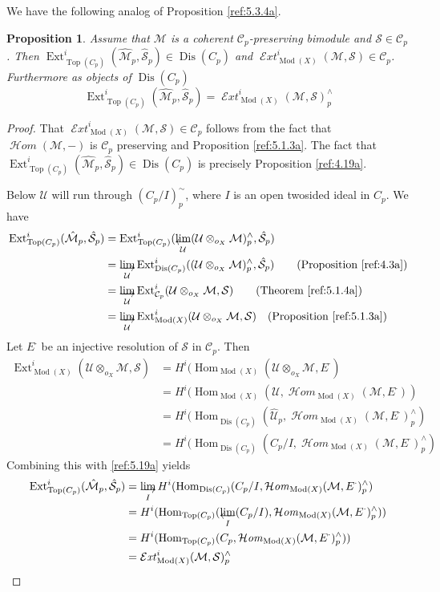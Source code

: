 \documentclass{amsproc}
\def\Cscr{{\mathcal C}}
\def\Escr{{\mathcal E}}
\def\Hscr{{\mathcal H}}
\def\Mscr{{\mathcal M}}
\def\Sscr{{\mathcal S}}
\def\Uscr{{\mathcal U}}
\DeclareMathOperator{\Dis}{Dis}
\def\HHom{\operatorname {\Hscr \mathit{om}}}
\def\HExt{\operatorname {\Escr \mathit{xt}}}
\def\Ext{\operatorname {Ext}}
\def\Hom{\operatorname {Hom}}
\def\HHom{\operatorname {\Hscr \mathit{om}}}
\def\HExt{\operatorname {\Escr \mathit{xt}}}
\def\Qch{\operatorname {Mod}}
\let\oldtext\text
\def\text#1{\oldtext{\upshape #1}}
\let\invlim\projlim
\DeclareMathOperator{\Top}{Top}
\newtheorem{propositions}[lemmas]{Proposition}
\theoremstyle{definition}
\theoremstyle{remark}
\def\dirlim{\mathop{\vtop{\baselineskip -100pt\lineskip -1pt\lineskiplimit 0pt
\setbox0\hbox{\upshape lim}\copy0\hbox to \wd0{\rightarrowfill}}}\limits}
\def\invlim{\mathop{\vtop{\baselineskip -100pt\lineskip -1pt\lineskiplimit 0pt
\setbox0\hbox{\upshape lim}\copy0\hbox to \wd0{\leftarrowfill}}}\limits}
\numberwithin{equation}{section}
\numberwithin{table}{section}
\numberwithin{figure}{section}
\begin{document}
We have the
following analog of Proposition \ref{ref:5.3.4a}.
\begin{propositions}
\label{ref:5.4.3a}
Assume that $\Mscr$ is a coherent $\Cscr_{p}$-preserving bimodule and
$\Sscr\in\Cscr_{p}$. Then 
$\Ext^i_{\Top(C_p)}(\hat{\Mscr}_{p},\hat{\Sscr}_{p})\in \Dis(C_p)$ and 
$\HExt^i_{\Qch(X)}(\Mscr,\Sscr)\in \Cscr_p$. 
Furthermore as
objects of $\Dis(C_p)$
\[
\Ext^i_{\Top(C_p)}(\hat{\Mscr}_{p},\hat{\Sscr}_{p})
=
\HExt^i_{\Qch(X)}(\Mscr,\Sscr)^\wedge_{p}
\]
\end{propositions}
\begin{proof} 
That $\HExt^i_{\Qch(X)}(\Mscr,\Sscr)\in \Cscr_p$ follows from
the fact that $\HHom(\Mscr,-)$ is $\Cscr_{p}$ preserving and
Proposition \ref{ref:5.1.3a}. The fact that 
$\Ext^i_{\Top(C_p)}(\hat{\Mscr}_{p},\hat{\Sscr}_{p})\in \Dis(C_p)$ is
precisely Proposition \ref{ref:4.19a}.


Below $\Uscr$ will run through $(C_p/I)^\sim_p$, where $I$
is an open twosided ideal in $C_p$.
We have
\begin{equation}
\label{ref:5.19a}
\begin{split}
\Ext^i_{\Top(C_p)}(\hat{\Mscr}_{p},\hat{\Sscr}_{p})&=
\Ext^i_{\Top(C_p)}(\invlim_\Uscr (\Uscr\otimes_{o_X}
\Mscr)^\wedge_{p},\hat{\Sscr}_{p})\\
&=
\dirlim_\Uscr \Ext^i_{\Dis(C_p)}((\Uscr\otimes_{o_X}
\Mscr)^\wedge_{p}, \hat{\Sscr}_{p})\qquad \text{(Proposition
\ref{ref:4.3a})}
\\ &=\dirlim_\Uscr \Ext^i_{\Cscr_p}(\Uscr\otimes_{o_X}\Mscr,\Sscr)
\qquad\text{(Theorem
\ref{ref:5.1.4a})}\\
&=\dirlim_\Uscr \Ext^i_{\Qch(X)}(\Uscr\otimes_{o_X}\Mscr,\Sscr)
\quad\text{(Proposition
\ref{ref:5.1.3a})}\end{split}
\end{equation}
Let $E^\cdot$ be an injective resolution of $\Sscr$ in $\Cscr_{p}$.
Then
\begin{align*}
\Ext^i_{\Qch(X)}(\Uscr\otimes_{o_X}\Mscr,\Sscr)&
=H^i(\Hom_{\Qch(X)}(\Uscr\otimes_{o_X} \Mscr,E^\cdot)\\
&=H^i(\Hom_{\Qch(X)}(\Uscr,\HHom_{\Qch(X)}(\Mscr,E^\cdot))\\
&=
H^i(\Hom_{\Dis(C_p)}(\hat{\Uscr}_p,\HHom_{\Qch(X)}(\Mscr,E^\cdot)^\wedge_p )
\\
&=H^i(\Hom_{\Dis(C_p)}(C_p/I,\HHom_{\Qch(X)}(\Mscr,E^\cdot)^\wedge_p )
\end{align*}
Combining this with \eqref{ref:5.19a} yields
\begin{align*}
\Ext^i_{\Top(C_p)}(\hat{\Mscr}_{p},\hat{\Sscr}_{p})
&=
\dirlim_I 
H^i(\Hom_{\Dis(C_p)}(C_p/I,
\HHom_{\Qch(X)}(\Mscr,E^\cdot)^\wedge_p )\\
&=H^i(\Hom_{\Top(C_p)}(\invlim_I(C_p/I),
\HHom_{\Qch(X)}(\Mscr,E^\cdot)^\wedge_p ))\\
&=H^i(\Hom_{\Top(C_p)}(C_p,\HHom_{\Qch(X)}(\Mscr,E^\cdot)^\wedge_p ))\\
&=\HExt^i_{\Qch(X)}(\Mscr,\Sscr)^\wedge_p 
\qed\end{align*}
\def\qed{}\end{proof}
\end{document}
